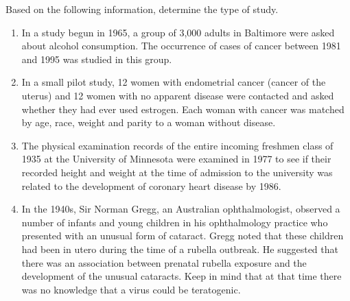 
Based on the following information, determine the type of study.

\begin{enumerate}
\item In a study begun in 1965, a group of 3,000 adults in Baltimore were asked about alcohol consumption.  The occurrence of cases of cancer between 1981 and 1995 was studied in this group.  

\begin{MultipleChoice}
\end{MultipleChoice}

\item In a small pilot study, 12 women with endometrial cancer (cancer of the uterus) and 12 women with no apparent disease were contacted and asked whether they had ever used estrogen.  Each woman with cancer was matched by age, race, weight and parity to a woman without disease.

\begin{MultipleChoice}
\end{MultipleChoice}

\item The physical examination records of the entire incoming freshmen class of 1935 at the University of Minnesota were examined in 1977 to see if their recorded height and weight at the time of admission to the university was related to the development of coronary heart disease by 1986.

\begin{MultipleChoice}
\end{MultipleChoice}

\item In the 1940s, Sir Norman Gregg, an Australian ophthalmologist, observed a number of infants and young children in his ophthalmology practice who presented with an unusual form of cataract.  Gregg noted that these children had been in utero during the time of a rubella outbreak.  He suggested that there was an association between prenatal rubella exposure and the development of the unusual cataracts.  Keep in mind that at that time there was no knowledge that a virus could be teratogenic.  


\end{enumerate}
